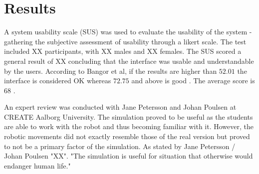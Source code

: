 \section{Results}
A system usability scale (SUS) was used to evaluate the usability of the system - gathering the subjective assessment of usability through a likert scale. The test included XX participants, with XX males and XX females. The SUS scored a general result of XX concluding that the interface was usable and understandable by the users. According to Bangor et al, if the results are higher than $52.01$ the interface is considered OK whereas $72.75$ and above is good \citep{bangor_empirical_2008}. The average score is 68 \citep{SUStified_sauro_2017}.

An expert review was conducted with Jane Petersson and Johan Poulsen at CREATE Aalborg University. The simulation proved to be useful as the students are able to work with the robot and thus becoming familiar with it. However, the robotic movements did not exactly resemble those of the real version but proved to not be a primary factor of the simulation. As stated by Jane Petersson / Johan Poulsen "XX". "The simulation is useful for situation that otherwise would endanger human life."

